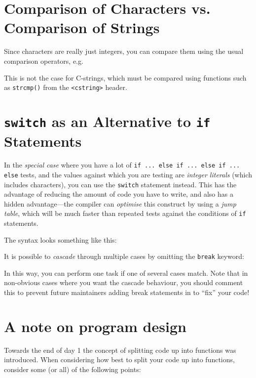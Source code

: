 \documentclass[a4paper]{scrartcl}
\begin{document}
\section{Comparison of Characters vs. Comparison of Strings}
Since characters are really just integers, you can compare them using the usual comparison operators, e.g.



This is not the case for C-strings, which must be compared using functions such as \texttt{strcmp()} from the \texttt{<cstring>} header.

\section{\texttt{switch} as an Alternative to \texttt{if} Statements}
In the \emph{special case} where you have a lot of \texttt{if ... else if ... else if ... else} tests, and the values against which you are testing are \emph{integer literals} (which includes characters), you can use the \texttt{switch} statement instead. This has the advantage of reducing the amount of code you have to write, and also has a hidden advantage---the compiler can \emph{optimise} this construct by using a \emph{jump table}, which will be much faster than repeated tests against the conditions of \texttt{if} statements.

The syntax looks something like this:



It is possible to \emph{cascade} through multiple cases by omitting the \texttt{break} keyword:



In this way, you can perform one task if one of several cases match. Note that in non-obvious cases where you want the cascade behaviour, you should comment this to prevent future maintainers adding break statements in to ``fix'' your code!

\section{A note on program design}
Towards the end of day 1 the concept of splitting code up into functions was introduced. When considering how best to split your code up into functions, consider some (or all) of the following points:
\end{document}
